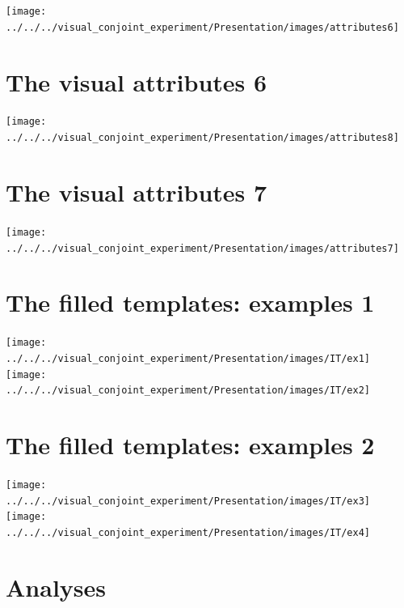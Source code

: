 \documentclass[
]{article}
\begin{document}
\begin{center}\texttt{[image: ../../../visual\_conjoint\_experiment/Presentation/images/attributes6]} \end{center}

\section{The visual attributes 6}\label{the-visual-attributes-6}

\begin{center}\texttt{[image: ../../../visual\_conjoint\_experiment/Presentation/images/attributes8]} \end{center}

\section{The visual attributes 7}\label{the-visual-attributes-7}

\begin{center}\texttt{[image: ../../../visual\_conjoint\_experiment/Presentation/images/attributes7]} \end{center}

\section{The filled templates: examples
1}\label{the-filled-templates-examples-1}

\begin{center}\texttt{[image: ../../../visual\_conjoint\_experiment/Presentation/images/IT/ex1]} \texttt{[image: ../../../visual\_conjoint\_experiment/Presentation/images/IT/ex2]} \end{center}

\section{The filled templates: examples
2}\label{the-filled-templates-examples-2}

\begin{center}\texttt{[image: ../../../visual\_conjoint\_experiment/Presentation/images/IT/ex3]} \texttt{[image: ../../../visual\_conjoint\_experiment/Presentation/images/IT/ex4]} \end{center}

\section{Analyses}\label{analyses}
\end{document}
